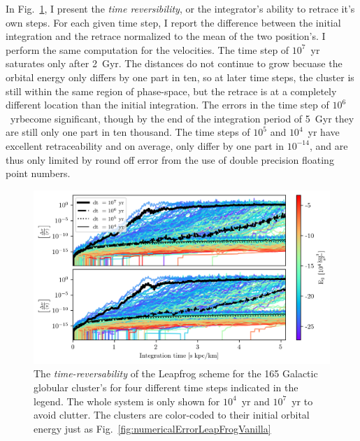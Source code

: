         In Fig.~\ref{fig:numericalErrorReverseIntegration}, I present the \textit{time reversibility}, or the integrator's ability to retrace it's own steps. For each given time step, I report the difference between the initial integration and the retrace normalized to the mean of the two position's. I perform the same computation for the velocities. The time step of $10^7$~yr saturates only after 2~Gyr. The distances do not continue to grow becuase the orbital energy only differs by one part in ten, so at later time steps, the cluster is still within the same region of phase-space, but the retrace is at a completely different location than the initial integration. The errors in the time step of $10^6$~yrbecome significant, though by the end of the integration period of 5~Gyr they are still only one part in ten thousand. The time steps of $10^5$ and $10^4$~yr have excellent retraceability and on average, only differ by one part in $10^{-14}$, and are thus only limited by round off error from the use of double precision floating point numbers.
        \begin{figure}
            \centering
            \includegraphics[width=\linewidth]{images/numericalErrorReverseIntegration.png}
            \caption{The \textit{time-reversability} of the Leapfrog scheme for the 165 Galactic globular cluster's for four different time steps indicated in the legend. The whole system is only shown for $10^4$~yr and $10^7$~yr to avoid clutter. The clusters are color-coded to their initial orbital energy just as Fig.~\ref{fig:numericalErrorLeapFrogVanilla}}
            \label{fig:numericalErrorReverseIntegration}
        \end{figure}

